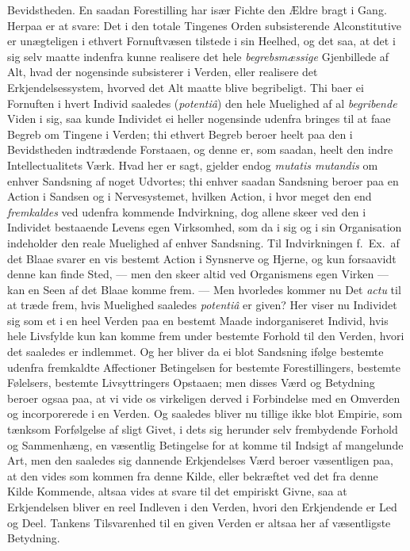 \documentclass[12pt,a4paper]{book}
\newcommand{\apage}[1]{\marginnote{\footnotesize\textit{[#1]}}}
\begin{document}
\apage{67} Bevidstheden. En saadan Forestilling har især Fichte den Ældre bragt i
Gang. Herpaa er at svare: Det i den totale Tingenes Orden subsisterende
Alconstitutive er unægteligen i ethvert Fornuftvæsen tilstede i sin
Heelhed, og det saa, at det i sig selv maatte indenfra kunne realisere
det hele \emph{begrebsmæssige} Gjenbillede af Alt, hvad der nogensinde
subsisterer i Verden, eller realisere det Erkjendelsessystem, hvorved
det Alt maatte blive begribeligt. Thi baer ei Fornuften i hvert Individ
saaledes (\textit{potentiâ}) den hele Muelighed af al \emph{begribende} Viden
i sig, saa kunde Individet ei heller nogensinde udenfra bringes til at
faae Begreb om Tingene i Verden; thi ethvert Begreb beroer heelt paa
den i Bevidstheden indtrædende Forstaaen, og denne er, som saadan,
heelt den indre Intellectualitets Værk. Hvad her er sagt, gjelder endog
\textit{mutatis mutandis} om enhver Sandsning af noget Udvortes; thi
enhver saadan Sandsning beroer paa en Action i Sandsen og i
Nervesystemet, hvilken Action, i hvor meget den end \emph{fremkaldes} ved
udenfra kommende Indvirkning, dog allene skeer ved den i Individet
bestaaende Levens egen Virksomhed, som da i sig og i sin Organisation
indeholder den reale Muelighed af enhver Sandsning. Til Indvirkningen
f.\ Ex.\ af det Blaae svarer en vis bestemt Action i Synsnerve og
Hjerne, og kun forsaavidt denne kan finde Sted, --- men den skeer
altid ved Organismens egen Virken --- kan en Seen af det Blaae komme
frem. --- Men hvorledes kommer nu Det \textit{actu} til at træde frem,
hvis Muelighed saaledes \textit{potentiâ} er given? Her viser nu
Individet sig som et i en heel Verden paa en bestemt Maade
indorganiseret Individ, hvis hele Livsfylde kun kan komme frem under
bestemte Forhold til den Verden, hvori det saaledes er indlemmet. Og
her bliver da ei blot Sandsning ifølge bestemte udenfra fremkaldte
Affectioner Betingelsen for bestemte Forestillingers, bestemte
Følelsers, bestemte Livsyttringers Opstaaen; men disses Værd og
Betydning beroer ogsaa paa, at vi vide os \apage{68} virkeligen derved i
Forbindelse med en Omverden og incorporerede i en Verden. Og saaledes
bliver nu tillige ikke blot Empirie, som tænksom Forfølgelse af sligt
Givet, i dets sig herunder selv frembydende Forhold og Sammenhæng, en
væsentlig Betingelse for at komme til Indsigt af mangelunde Art, men
den saaledes sig dannende Erkjendelses Værd beroer væsentligen paa, at
den vides som kommen fra denne Kilde, eller bekræftet ved det fra denne
Kilde Kommende, altsaa vides at svare til det empiriskt Givne, saa at
Erkjendelsen bliver en reel Indleven i den Verden, hvori den
Erkjendende er Led og Deel. Tankens Tilsvarenhed til en given Verden er
altsaa her af væsentligste Betydning.
\end{document}
